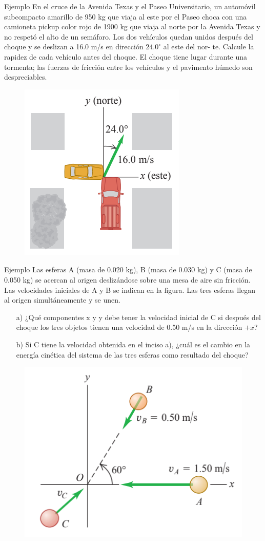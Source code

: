 \begin{frame}{Ejemplo}
    En el cruce de la Avenida
Texas y el Paseo Universitario, un
automóvil subcompacto amarillo
de 950 kg que viaja al este por el
Paseo choca con una camioneta
pickup color rojo de 1900 kg que
viaja al norte por la Avenida Texas y no respetó el alto de un semáforo. Los dos vehículos quedan unidos después
del choque y se deslizan a 16.0 m/s
en dirección $24.0^\circ$ al este del nor-
te. Calcule la rapidez de cada vehículo antes del choque. El choque tiene lugar durante una tormenta; las fuerzas de fricción entre los
vehículos y el pavimento húmedo son despreciables.

\begin{figure}
    \centering
    \includegraphics[width=0.25\linewidth]{figures/choque1.png}
\end{figure}
\end{frame}

\begin{frame}{Ejemplo}
    Las esferas A (masa de 0.020 kg), B (masa de 0.030 kg) y C (masa de 0.050 kg) se acercan al origen deslizándose sobre una mesa
de aire sin fricción. Las velocidades iniciales de A y B
se indican en la figura. Las tres esferas llegan al origen simultáneamente y se unen.

\begin{itemize}
    \item[a)] ¿Qué componentes x y y debe tener la velocidad
inicial de C si después del choque los tres objetos tienen una velocidad de 0.50 m/s en la dirección $+x$? 
    \item[b)] Si C tiene la velocidad obtenida en el inciso a), ¿cuál es el cambio en la energía cinética del sistema
de las tres esferas como resultado del choque?
\end{itemize}

\begin{figure}
    \centering
    \includegraphics[width=0.25\linewidth]{figures/choque2.png}
\end{figure}
\end{frame}

